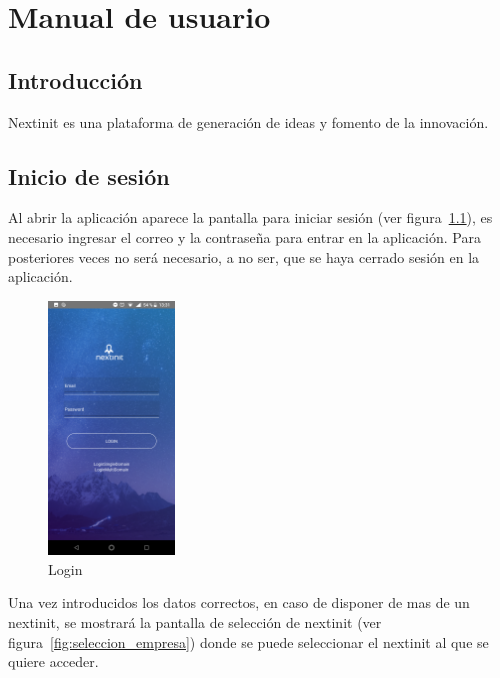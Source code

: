 \chapter{Manual de usuario}

\section{Introducción}

Nextinit es una plataforma de generación de ideas y fomento de la innovación. 

\section{Inicio de sesión}

Al abrir la aplicación aparece la pantalla para iniciar sesión (ver figura~\ref{fig:login}), es 
necesario ingresar el correo y la contraseña para entrar en la aplicación. Para posteriores 
veces no será necesario, a no ser, que se haya cerrado sesión en la aplicación.

\begin{figure}[!h]
	\begin{center}
		\includegraphics[width=0.3\textwidth]{./img/anexo1/login.png}
		\caption{Login}
		\label{fig:login}
	\end{center}
\end{figure}

Una vez introducidos los datos correctos, en caso de disponer de mas de un nextinit,
se mostrará la pantalla de selección de nextinit (ver figura~\ref{fig:seleccion_empresa}) 
donde se puede seleccionar el nextinit al que se quiere acceder.

